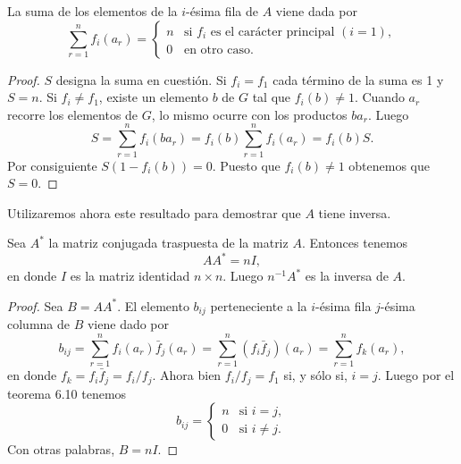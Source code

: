 \documentclass[12pt,a4paper]{book}
\begin{document}
    \begin{teorema}
        La suma de los elementos de la $i$-ésima fila de $A$ viene dada por
        \begin{equation*}
            \sum_{r=1}^{n}f_{i}(a_{r})=
            \begin{cases}
                n&\text{si }f_{i}\text{ es el carácter principal }(i=1),\\
                0&\text{en otro caso.}
            \end{cases}
        \end{equation*}
    \end{teorema}

    \begin{proof}
        $S$ designa la suma en cuestión. Si $f_{i}=f_{1}$ cada término de la suma es 1 y
        $S=n$. Si $f_{i}\neq f_{1}$, existe un elemento $b$ de $G$ tal que $f_{i}(b)\neq1$.
        Cuando $a_{r}$ recorre los elementos de $G$, lo mismo ocurre con los productos
        $ba_{r}$. Luego
        \begin{equation*}
            S=\sum_{r=1}^{n}f_{i}(ba_{r})=f_{i}(b)\sum_{r=1}^{n}f_{i}(a_{r})=f_{i}(b)S.
        \end{equation*}
        Por consiguiente $S(1-f_{i}(b))=0$. Puesto que $f_{i}(b)\neq1$ obtenemos que $S=0$.
    \end{proof}

    Utilizaremos ahora este resultado para demostrar que $A$ tiene inversa.

    \begin{teorema}
        Sea $A^{*}$ la matriz conjugada traspuesta de la matriz $A$. Entonces tenemos
        \begin{equation*}
            AA^{*}=nI,
        \end{equation*}
        en donde $I$ es la matriz identidad $n\times n$. Luego $n^{-1}A^{*}$ es la inversa de
        $A$.
    \end{teorema}

    \begin{proof}
        Sea $B=AA^{*}$. El elemento $b_{ij}$ perteneciente a la $i$-ésima fila $j$-ésima
        columna de $B$ viene dado por
        \begin{equation*}
            b_{ij}=\sum_{r=1}^{n}f_{i}(a_{r})\bar{f}_{j}(a_{r})=\sum_{r=1}^{n}(f_{i}\bar{f}_{j})(a_{r})
            =\sum_{r=1}^{n}f_{k}(a_{r}),
        \end{equation*}
        en donde $f_{k}=f_{i}\bar{f}_{j}=f_{i}/f_{j}$. Ahora bien $f_{i}/f_{j}=f_{1}$ si, y sólo si,
        $i=j$. Luego por el teorema 6.10 tenemos
        \begin{equation*}
            b_{ij}=
            \begin{cases}
                n&\text{si }i=j,\\
                0&\text{si }i\neq j.
            \end{cases}
        \end{equation*}
        Con otras palabras, $B=nI$.
    \end{proof}
\end{document}
